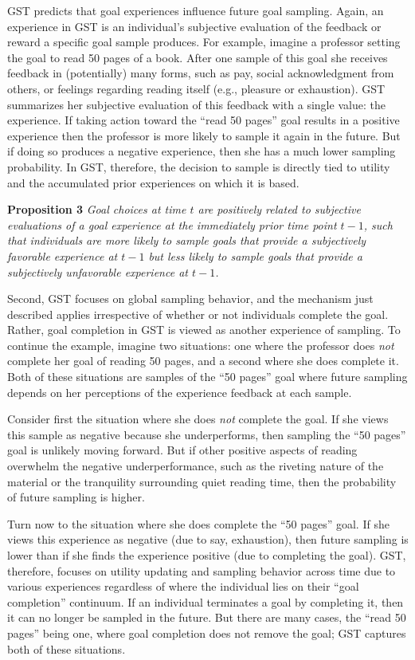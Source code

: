 \documentclass[english,,man]{apa6}
\theoremstyle{definition}
\theoremstyle{definition}
\theoremstyle{definition}
\theoremstyle{remark}
\begin{document}
GST predicts that goal experiences influence future goal sampling.
Again, an experience in GST is an individual's subjective evaluation of
the feedback or reward a specific goal sample produces. For example,
imagine a professor setting the goal to read 50 pages of a book. After
one sample of this goal she receives feedback in (potentially) many
forms, such as pay, social acknowledgment from others, or feelings
regarding reading itself (e.g., pleasure or exhaustion). GST summarizes
her subjective evaluation of this feedback with a single value: the
experience. If taking action toward the \enquote{read 50 pages} goal
results in a positive experience then the professor is more likely to
sample it again in the future. But if doing so produces a negative
experience, then she has a much lower sampling probability. In GST,
therefore, the decision to sample is directly tied to utility and the
accumulated prior experiences on which it is based.

\textbf{Proposition 3} \emph{Goal choices at time \(t\) are positively
related to subjective evaluations of a goal experience at the
immediately prior time point \(t - 1\), such that individuals are more
likely to sample goals that provide a subjectively favorable experience
at \(t - 1\) but less likely to sample goals that provide a subjectively
unfavorable experience at \(t - 1\).}

Second, GST focuses on global sampling behavior, and the mechanism just
described applies irrespective of whether or not individuals complete
the goal. Rather, goal completion in GST is viewed as another experience
of sampling. To continue the example, imagine two situations: one where
the professor does \emph{not} complete her goal of reading 50 pages, and
a second where she does complete it. Both of these situations are
samples of the \enquote{50 pages} goal where future sampling depends on
her perceptions of the experience feedback at each sample.

Consider first the situation where she does \emph{not} complete the
goal. If she views this sample as negative because she underperforms,
then sampling the \enquote{50 pages} goal is unlikely moving forward.
But if other positive aspects of reading overwhelm the negative
underperformance, such as the riveting nature of the material or the
tranquility surrounding quiet reading time, then the probability of
future sampling is higher.

Turn now to the situation where she does complete the \enquote{50 pages}
goal. If she views this experience as negative (due to say, exhaustion),
then future sampling is lower than if she finds the experience positive
(due to completing the goal). GST, therefore, focuses on utility
updating and sampling behavior across time due to various experiences
regardless of where the individual lies on their \enquote{goal
completion} continuum. If an individual terminates a goal by completing
it, then it can no longer be sampled in the future. But there are many
cases, the \enquote{read 50 pages} being one, where goal completion does
not remove the goal; GST captures both of these situations.
\end{document}
